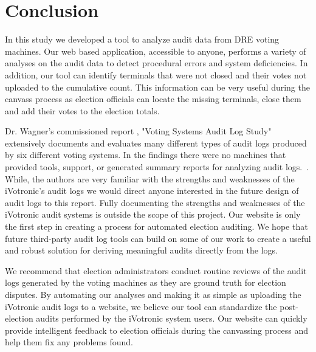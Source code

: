 \section{Conclusion}
In this study we developed a tool to analyze audit data from DRE voting machines. Our web based application, accessible to anyone, performs a variety of analyses on the audit data to detect procedural errors and system deficiencies. In addition, our tool can identify terminals that were not closed and their votes not uploaded to the cumulative count. This information can be very useful during the canvass process as election officials can locate the missing terminals, close them and add their votes to the election totals. 

Dr. Wagner's commissioned report ,  "Voting Systems Audit Log Study" extensively documents and evaluates many different types of audit logs produced by six different voting systems.  In the findings there were no machines that provided tools, support, or generated summary reports for analyzing audit logs.~\cite{Wagner2010}. While, the authors are very familiar with the strengths and weaknesses of the iVotronic's audit logs we would direct anyone interested in the future design of audit logs to this report.  Fully documenting the strengths and weaknesses of the iVotronic audit systems is outside the scope of this project. Our website is only the first step in creating a process for automated election auditing.  We hope that future third-party audit log  tools can build on some of our work to create a useful and robust solution for deriving meaningful audits directly from the logs.

We recommend that election administrators conduct routine reviews of the audit logs generated by the voting machines as they are ground truth for election disputes. By automating our analyses and making it as simple as uploading the iVotronic audit logs to a website, we believe our tool can standardize the post-election audits performed by the iVotronic system users. Our website can quickly provide intelligent feedback to election officials during the canvassing process and help them fix any problems found. 
